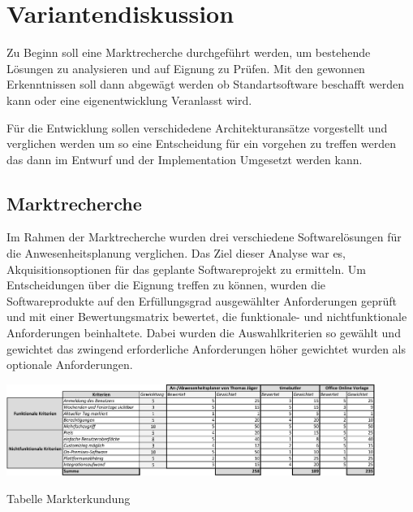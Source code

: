 \section{Variantendiskussion}
\label{sec:Variantendiskussion}
Zu Beginn soll eine Marktrecherche durchgeführt werden, um bestehende Lösungen zu analysieren und auf Eignung zu Prüfen. Mit den gewonnen Erkenntnissen soll dann abgewägt werden ob Standartsoftware beschafft werden kann oder eine eigenentwicklung Veranlasst wird.

Für die Entwicklung sollen verschidedene Architekturansätze vorgestellt und verglichen werden um so eine Entscheidung für ein vorgehen zu treffen werden das dann im Entwurf und der Implementation Umgesetzt werden kann.

\subsection{Marktrecherche}
\label{sec:Marktrecherche}
Im Rahmen der Marktrecherche wurden drei verschiedene Softwarelösungen für die Anwesenheitsplanung verglichen. Das Ziel dieser Analyse war es, Akquisitionsoptionen für das geplante Softwareprojekt zu ermitteln. Um Entscheidungen über die Eignung treffen zu können, wurden die Softwareprodukte auf den Erfüllungsgrad ausgewählter Anforderungen geprüft und mit einer Bewertungsmatrix bewertet, die funktionale- und nichtfunktionale Anforderungen beinhaltete. Dabei wurden die Auswahlkriterien so gewählt und gewichtet das zwingend erforderliche Anforderungen höher gewichtet wurden als optionale Anforderungen.

\begin{table}[htbp]
    \centering
    \includegraphics[width=0.9\textwidth,angle=0]{abb/Markterkundung.pdf}
    \caption[Beschreibung]{ Tabelle Markterkundung}
    \label{tab:Markterkundung}
\end{table}

